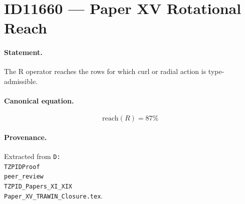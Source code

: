 \section*{ID11660 --- Paper XV Rotational Reach}

\paragraph{Statement.}
The R operator reaches the rows for which curl or radial action is type-admissible.

\paragraph{Canonical equation.}
\[
\mathrm{reach}(R)=87\%
\]

\paragraph{Provenance.}
Extracted from \texttt{D:\\TZPIDProof\\peer\_review\\TZPID\_Papers\_XI\_XIX\\Paper\_XV\_TRAWIN\_Closure.tex}.
